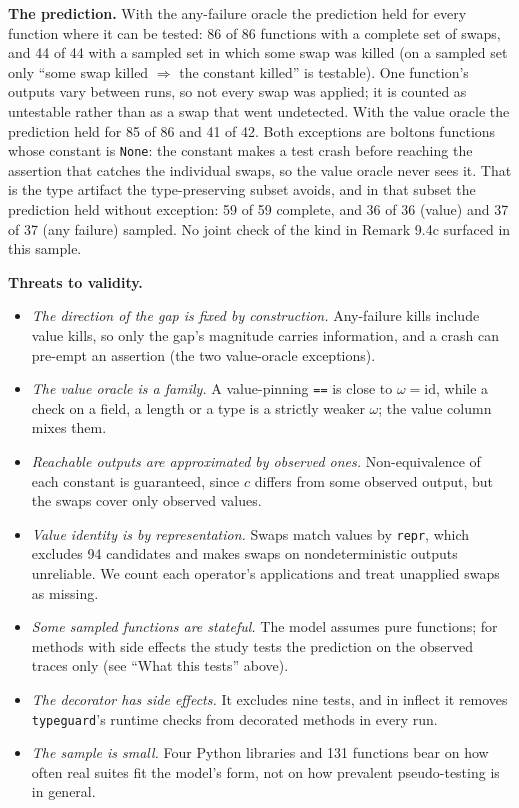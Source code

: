 \documentclass[conference]{IEEEtran}
\theoremstyle{run}
\begin{document}
\textbf{The prediction.} With the any-failure oracle the prediction held for every function where it can be tested: 86 of 86 functions with a complete set of swaps, and 44 of 44 with a sampled set in which some swap was killed (on a sampled set only ``some swap killed $\Rightarrow$ the constant killed'' is testable). One function's outputs vary between runs, so not every swap was applied; it is counted as untestable rather than as a swap that went undetected. With the value oracle the prediction held for 85 of 86 and 41 of 42. Both exceptions are boltons functions whose constant is \texttt{None}: the constant makes a test crash before reaching the assertion that catches the individual swaps, so the value oracle never sees it. That is the type artifact the type-preserving subset avoids, and in that subset the prediction held without exception: 59 of 59 complete, and 36 of 36 (value) and 37 of 37 (any failure) sampled. No joint check of the kind in Remark 9.4c surfaced in this sample.

\textbf{Threats to validity.}

\begin{itemize}
\item \emph{The direction of the gap is fixed by construction.} Any-failure kills include value kills, so only the gap's magnitude carries information, and a crash can pre-empt an assertion (the two value-oracle exceptions).
\item \emph{The value oracle is a family.} A value-pinning \texttt{==} is close to $\omega = \mathrm{id}$, while a check on a field, a length or a type is a strictly weaker $\omega$; the value column mixes them.
\item \emph{Reachable outputs are approximated by observed ones.} Non-equivalence of each constant is guaranteed, since $c$ differs from some observed output, but the swaps cover only observed values.
\item \emph{Value identity is by representation.} Swaps match values by \texttt{repr}, which excludes 94 candidates and makes swaps on nondeterministic outputs unreliable. We count each operator's applications and treat unapplied swaps as missing.
\item \emph{Some sampled functions are stateful.} The model assumes pure functions; for methods with side effects the study tests the prediction on the observed traces only (see ``What this tests'' above).
\item \emph{The decorator has side effects.} It excludes nine tests, and in inflect it removes \texttt{typeguard}'s runtime checks from decorated methods in every run.
\item \emph{The sample is small.} Four Python libraries and 131 functions bear on how often real suites fit the model's form, not on how prevalent pseudo-testing is in general.
\end{itemize}
\end{document}
